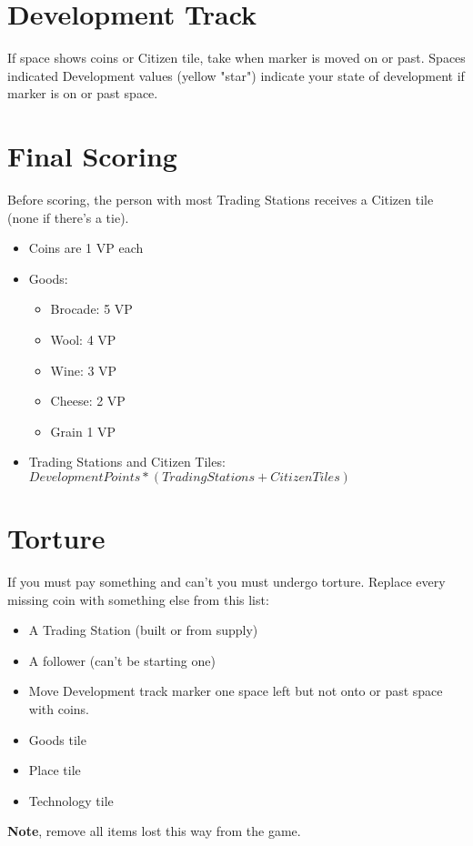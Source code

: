 \documentclass[8pt]{article}
\newenvironment{itemizeCustom}
{\begin{itemize}
  \setlength{\itemsep}{1pt}
  \setlength{\parskip}{0pt}
  \setlength{\parsep}{0pt}}
{\end{itemize}}
\begin{document}
\begin{multicols*}{2}
\section*{Development Track}
If space shows coins or Citizen tile, take when marker is moved on or past. Spaces indicated Development values (yellow "star") indicate your state of development if marker is on or past space.

\section*{Final Scoring}
Before scoring, the person with most Trading Stations receives a Citizen tile (none if there's a tie).
\begin{itemizeCustom}
    \item Coins are 1 VP each
    \item Goods:
        \begin{itemizeCustom}
            \item Brocade: 5 VP
            \item Wool: 4 VP
            \item Wine: 3 VP
            \item Cheese: 2 VP
            \item Grain 1 VP
        \end{itemizeCustom}
    \item Trading Stations and Citizen Tiles: \(Development Points * (Trading Stations + Citizen Tiles)\)
\end{itemizeCustom}

\section*{Torture}
If you must pay something and can't you must undergo torture. Replace every missing coin with something else from this list:
\begin{itemizeCustom}
    \item A Trading Station (built or from supply)
    \item A follower (can't be starting one)
    \item Move Development track marker one space left but not onto or past space with coins.
    \item Goods tile
    \item Place tile
    \item Technology tile
\end{itemizeCustom}
\textbf{Note}, remove all items lost this way from the game.

\end{multicols*}
\end{document}
